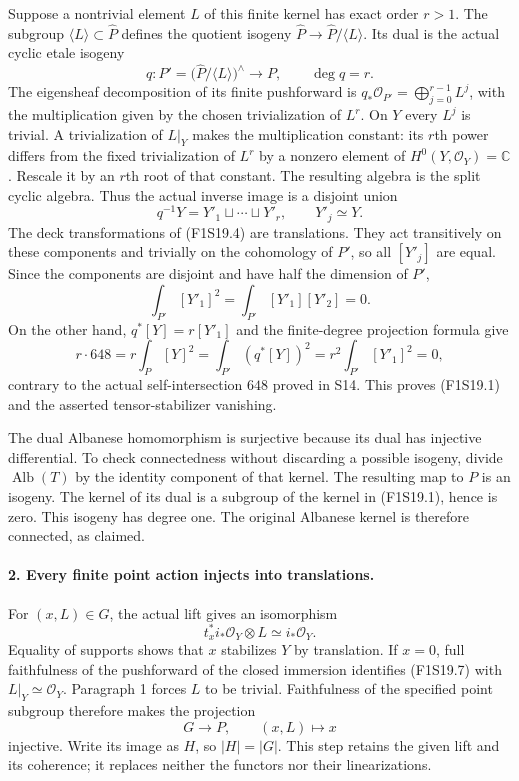 Suppose a nontrivial element $L$ of this finite kernel has exact
order $r>1$. The subgroup $\langle L\rangle\subset\widehat P$
defines the quotient isogeny
$\widehat P\to\widehat P/\langle L\rangle$. Its dual is the
actual cyclic etale isogeny
\[
             q:P'=\bigl(\widehat P/\langle L\rangle\bigr)^\wedge
                          \longrightarrow P,\qquad\deg q=r.
 \tag{F1S19.4}
\]
The eigensheaf decomposition of its finite pushforward is
$q_*\mathcal O_{P'}=\bigoplus_{j=0}^{r-1}L^j$, with the
multiplication given by the chosen trivialization of $L^r$.
On $Y$ every $L^j$ is trivial. A trivialization of $L|_Y$ makes
the multiplication constant: its $r$th power differs from the
fixed trivialization of $L^r$ by a nonzero element of
$H^0(Y,\mathcal O_Y)=\mathbb C$. Rescale it by an $r$th root
of that constant. The resulting algebra is the split cyclic
algebra. Thus the actual inverse image is a disjoint union
\[
                      q^{-1}Y=Y'_1\sqcup\cdots\sqcup Y'_r,
                          \qquad Y'_j\simeq Y.
 \tag{F1S19.5}
\]
The deck transformations of (F1S19.4) are translations. They
act transitively on these components and trivially on the
cohomology of $P'$, so all $[Y'_j]$ are equal. Since the
components are disjoint and have half the dimension of $P'$,
\[
                  \int_{P'}[Y'_1]^2
                     =\int_{P'}[Y'_1][Y'_2]=0.
\]
On the other hand, $q^*[Y]=r[Y'_1]$ and the finite-degree
projection formula give
\[
   r\cdot648
       =r\int_P[Y]^2
       =\int_{P'}(q^*[Y])^2
       =r^2\int_{P'}[Y'_1]^2=0,
 \tag{F1S19.6}
\]
contrary to the actual self-intersection $648$ proved in S14.
This proves (F1S19.1) and the asserted tensor-stabilizer vanishing.

The dual Albanese homomorphism is surjective because its dual
has injective differential. To check connectedness without
discarding a possible isogeny, divide $\operatorname{Alb}(T)$
by the identity component of that kernel. The resulting map
to $P$ is an isogeny. The kernel of its dual is a subgroup of
the kernel in (F1S19.1), hence is zero. This isogeny has degree
one. The original Albanese kernel is therefore connected, as
claimed.

\paragraph{2. Every finite point action injects into translations.}
For $(x,L)\in G$, the actual lift gives an isomorphism
\[
                    t_x^*i_*\mathcal O_Y\otimes L
                                      \simeq i_*\mathcal O_Y.
 \tag{F1S19.7}
\]
Equality of supports shows that $x$ stabilizes $Y$ by translation.
If $x=0$, full faithfulness of the pushforward of the closed
immersion identifies (F1S19.7) with
$L|_Y\simeq\mathcal O_Y$. Paragraph 1 forces $L$ to be trivial.
Faithfulness of the specified point subgroup therefore makes
the projection
\[
                  G\longrightarrow P,\qquad (x,L)\longmapsto x
 \tag{F1S19.8}
\]
injective. Write its image as $H$, so $|H|=|G|$. This step
retains the given lift and its coherence; it replaces neither
the functors nor their linearizations.

